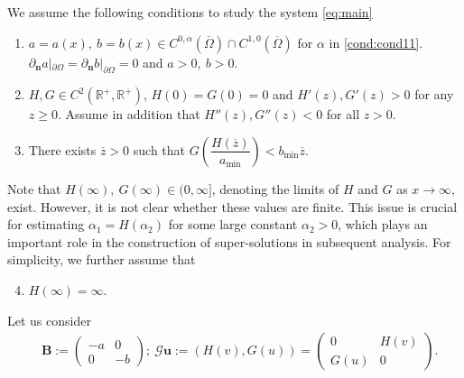 \documentclass[a4paper,11pt]{amsart}
\theoremstyle{definition}
\def\R{\mathbb{R}}
\def\O{\Omega}
\numberwithin{equation}{section}
\theoremstyle{definition}
\def\O{\Omega}
\begin{document}
We assume the following conditions to study the system \eqref{eq:main}
\begin{enumerate}[label=(B\arabic*)]  

\item \label{cond:cond1} $a=a(x),~b=b(x)\in C^{0,\alpha}(\overline{\O})\cap C^{1,0}(\overline{\O})$  for $\alpha$ in \ref{cond:cond11}. $\partial_{\textbf{n}} a|_{\partial \O}=\partial_{\textbf{n}} b|_{\partial \O}=0$ and $a>0,~b>0$.

\item  \label{cond:cond2} $H,G\in C^2(\R^+,\R^+)$, $H(0)=G(0)=0$ and $H'(z),G'(z)>0$ for any $z\geq 0$. Assume in addition that $H''(z),G''(z)<0$ for all $z>0$. 

\item \label{cond:cond3} There exists $\overline{z}>0$ such that $G\left(\dfrac{H(\overline{z})}{{a_{\min}}}\right)<b_{\min} \overline{z}$.










\end{enumerate}
Note that $H(\infty),~G(\infty)\in (0,\infty]$, denoting the limits of $H$ and $G$ as $x\to\infty$, exist. However, it is not clear whether these values are finite. This issue is crucial for estimating $\alpha_1 = H(\alpha_2)$ for some large constant $\alpha_2 > 0$, which plays an important role in the construction of super-solutions in subsequent analysis. For simplicity, we further assume that
\begin{enumerate}[label=(B\arabic*)]  
\setcounter{enumi}{3}
\item \label{cond:cond4} $H(\infty)=\infty$.
\end{enumerate}

Let us consider
\begin{align*}
&\textbf{B}:=\left(\begin{matrix}
-a&0\\
0&-b
\end{matrix}\right);~\mathcal{G}\textbf{u}:=(H(v),G(u))=\left(\begin{matrix}
0&H(v)\\
G(u)&0
\end{matrix}\right).
\end{align*}
\end{document}
